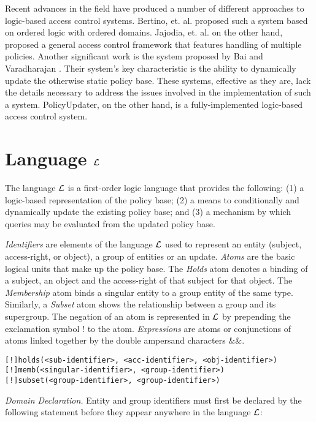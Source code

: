 \documentclass{llncs}
\begin{document}
    Recent advances in the field have produced a number of different approaches
    to logic-based access control systems. Bertino, et. al. \cite{BER} proposed
    such a system based on ordered logic with ordered domains. Jajodia, et. al.
    \cite{JAJ} on the other hand, proposed a general access control framework
    that features handling of multiple policies. Another significant work is
    the system proposed by Bai and Varadharajan \cite{BAI}. Their system's key
    characteristic is the ability to dynamically update the otherwise static
    policy base. These systems, effective as they are, lack the details
    necessary to address the issues involved in the implementation of such
    a system. PolicyUpdater, on the other hand, is a fully-implemented
    logic-based access control system.

  \section{Language $\cal{L}$}

    The language $\cal{L}$ is a first-order logic language that provides the
    following:  (1) a logic-based representation of the policy base; (2) a
    means to conditionally and dynamically update the existing policy base;
    and (3) a mechanism by which queries may be evaluated from the updated
    policy base.

    \emph{Identifiers} are elements of the language $\cal{L}$ used to represent
    an entity (subject, access-right, or object), a group of entities or an
    update. \emph{Atoms} are the basic logical units that make up the
    policy base. The \emph{Holds} atom denotes a binding of a subject,
    an object and the access-right of that subject for that object.
    The \emph{Membership} atom binds a singular entity to a group entity of
    the same type. Similarly, a \emph{Subset} atom shows the relationship
    between a group and its supergroup. The negation of an atom is represented
    in $\cal{L}$ by prepending the exclamation symbol $!$ to the atom.
    \emph{Expressions} are atoms or conjunctions of atoms linked together by
    the double ampersand characters $\&\&$.

    \begin{verbatim}
[!]holds(<sub-identifier>, <acc-identifier>, <obj-identifier>)
[!]memb(<singular-identifier>, <group-identifier>)
[!]subset(<group-identifier>, <group-identifier>)
\end{verbatim}

    \noindent
    \emph{Domain Declaration.} Entity and group identifiers must first be
    declared by the following statement before they appear anywhere in the
    language $\cal{L}$:
\end{document}
